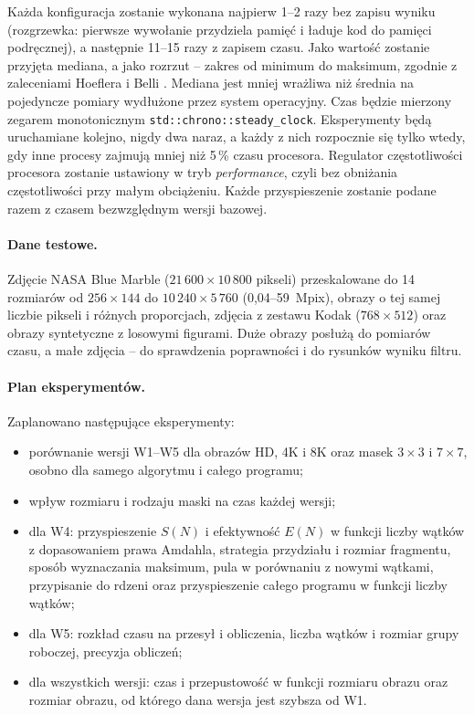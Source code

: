 \documentclass[12pt,a4paper]{article}
\newcommand{\kod}[1]{\texttt{#1}}
\begin{document}
Każda konfiguracja zostanie wykonana najpierw 1--2 razy bez zapisu wyniku (rozgrzewka: pierwsze wywołanie przydziela pamięć i ładuje kod do pamięci podręcznej), a następnie 11--15 razy z zapisem czasu. Jako wartość zostanie przyjęta mediana, a jako rozrzut -- zakres od minimum do maksimum, zgodnie z zaleceniami Hoeflera i Belli \cite{hoefler}. Mediana jest mniej wrażliwa niż średnia na pojedyncze pomiary wydłużone przez system operacyjny. Czas będzie mierzony zegarem monotonicznym \kod{std::chrono::steady\_clock}. Eksperymenty będą uruchamiane kolejno, nigdy dwa naraz, a każdy z nich rozpocznie się tylko wtedy, gdy inne procesy zajmują mniej niż 5\,\% czasu procesora. Regulator częstotliwości procesora zostanie ustawiony w tryb \emph{performance}, czyli bez obniżania częstotliwości przy małym obciążeniu. Każde przyspieszenie zostanie podane razem z czasem bezwzględnym wersji bazowej.

\paragraph{Dane testowe.} Zdjęcie NASA Blue Marble ($21\,600 \times 10\,800$ pikseli) przeskalowane do 14 rozmiarów od $256 \times 144$ do $10\,240 \times 5\,760$ (0,04--59~Mpix), obrazy o tej samej liczbie pikseli i różnych proporcjach, zdjęcia z zestawu Kodak ($768 \times 512$) oraz obrazy syntetyczne z losowymi figurami. Duże obrazy posłużą do pomiarów czasu, a małe zdjęcia -- do sprawdzenia poprawności i do rysunków wyniku filtru.

\paragraph{Plan eksperymentów.} Zaplanowano następujące eksperymenty:
\begin{itemize}
	\item porównanie wersji W1--W5 dla obrazów HD, 4K i 8K oraz masek $3\times3$ i $7\times7$, osobno dla samego algorytmu i całego programu;
	\item wpływ rozmiaru i rodzaju maski na czas każdej wersji;
	\item dla W4: przyspieszenie $S(N)$ i efektywność $E(N)$ w funkcji liczby wątków z dopasowaniem prawa Amdahla, strategia przydziału i rozmiar fragmentu, sposób wyznaczania maksimum, pula w porównaniu z nowymi wątkami, przypisanie do rdzeni oraz przyspieszenie całego programu w funkcji liczby wątków;
	\item dla W5: rozkład czasu na przesył i obliczenia, liczba wątków i rozmiar grupy roboczej, precyzja obliczeń;
	\item dla wszystkich wersji: czas i przepustowość w funkcji rozmiaru obrazu oraz rozmiar obrazu, od którego dana wersja jest szybsza od W1.
\end{itemize}
\end{document}
